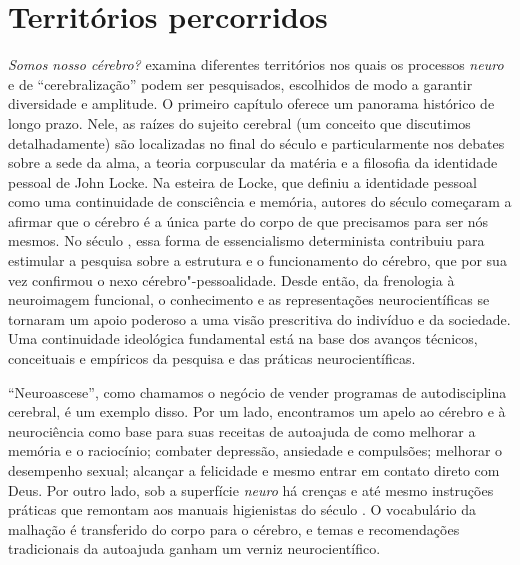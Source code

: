 \section{Territórios percorridos}

\emph{Somos nosso cérebro?} examina diferentes territórios nos quais os
processos \emph{neuro} e de ``cerebralização'' podem ser pesquisados,
escolhidos de modo a garantir diversidade e amplitude. O primeiro
capítulo oferece um panorama histórico de longo prazo. Nele, as raízes
do sujeito cerebral (um conceito que discutimos detalhadamente) são
localizadas no final do século  e particularmente nos debates sobre
a sede da alma, a teoria corpuscular da matéria e a filosofia da
identidade pessoal de John Locke. Na esteira de Locke, que definiu a
identidade pessoal como uma continuidade de consciência e memória,
autores do século  começaram a afirmar que o cérebro é a única
parte do corpo de que precisamos para ser nós mesmos. No século ,
essa forma de essencialismo determinista contribuiu para estimular a
pesquisa sobre a estrutura e o funcionamento do cérebro, que por sua vez
confirmou o nexo cérebro"-pessoalidade. Desde então, da frenologia à
neuroimagem funcional, o conhecimento e as representações
neurocientíficas se tornaram um apoio poderoso a uma visão prescritiva
do indivíduo e da sociedade. Uma continuidade ideológica fundamental
está na base dos avanços técnicos, conceituais e empíricos da pesquisa e
das práticas neurocientíficas.

``Neuroascese'', como chamamos o negócio de vender programas de
autodisciplina cerebral, é um exemplo disso. Por um lado, encontramos um
apelo ao cérebro e à neurociência como base para suas receitas de
autoajuda de como melhorar a memória e o raciocínio; combater depressão,
ansiedade e compulsões; melhorar o desempenho sexual; alcançar a
felicidade e mesmo entrar em contato direto com Deus. Por outro lado,
sob a superfície \emph{neuro} há crenças e até mesmo instruções práticas
que remontam aos manuais higienistas do século . O vocabulário da
malhação é transferido do corpo para o cérebro, e temas e recomendações
tradicionais da autoajuda ganham um verniz neurocientífico.

